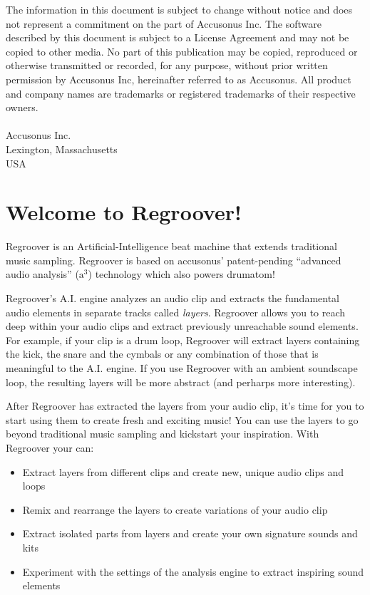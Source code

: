 \documentclass[12pt]{article}
\begin{document}

\newpage
The information in this document is subject to change without notice and does not represent a commitment on the part of Accusonus Inc. The software described by this document is subject to a License Agreement and may not be copied to other media. No part of this publication may be copied, reproduced or otherwise transmitted or recorded, for any purpose, without prior written permission by Accusonus Inc, hereinafter referred to as Accusonus. All product and company names are trademarks or registered trademarks of their respective owners.\\
\\
Accusonus Inc.\\
Lexington, Massachusetts\\
USA\\ 
\newpage

\section*{Welcome to Regroover!}
Regroover is an Artificial-Intelligence beat machine that extends traditional music sampling. Regroover is based on accusonus' patent-pending ``advanced audio analysis'' ($\mathrm{a^3}$) technology which also powers drumatom!

Regroover's A.I. engine analyzes an audio clip and extracts the fundamental audio elements in separate tracks called \textit{layers}. Regroover allows you to reach deep within your audio clips and extract previously unreachable sound elements. For example, if your clip is a drum loop, Regroover will extract layers containing the kick, the snare and the cymbals or any combination of those that is meaningful to the A.I. engine. If you use Regroover with an ambient soundscape loop, the resulting layers will be more abstract (and perharps more interesting).

After Regroover has extracted the layers from your audio clip, it's time for you to start using them to create fresh and exciting music! You can use the layers to go beyond traditional music sampling and kickstart your inspiration. With Regroover your can:
\begin{itemize}
\item Extract layers from different clips and create new, unique audio clips and loops
\item Remix and rearrange the layers to create variations of your audio clip
\item Extract isolated parts from layers and create your own signature sounds and kits
\item Experiment with the settings of the analysis engine to extract inspiring sound elements
\end{itemize}
\end{document}
